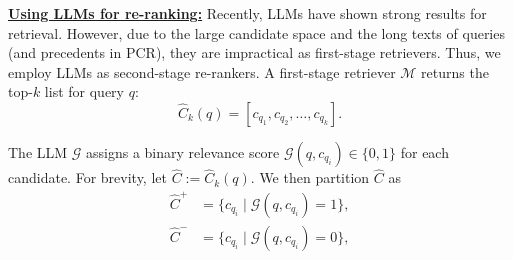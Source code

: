\vspace{1mm}
\noindent\underline{\textbf{Using LLMs for re-ranking:}} 
Recently, LLMs have shown strong results for retrieval. However, due to the large candidate space and the long texts of queries (and precedents in PCR), they are impractical as first-stage retrievers. Thus, we employ LLMs as second-stage re-rankers. A first-stage retriever $\mathcal M$ returns the top-$k$ list for query $q$:
\vspace{-2mm}
\[\hat{C}_k(q) = [c_{q_1}, c_{q_2}, \ldots, c_{q_k}].\]

\vspace{-2mm}
\noindent The LLM $\mathcal G$ assigns a binary relevance score $\mathcal G(q,c_{q_i}) \in \{0,1\}$ for each candidate. For brevity, let $\hat C := \hat{C}_k(q)$. We then partition $\hat C$ as
\vspace{-2mm}
\begin{align*}
\hat C^+ &= \{c_{q_i} \mid \mathcal G(q,c_{q_i})=1\}, \\
\hat C^- &= \{c_{q_i} \mid \mathcal G(q,c_{q_i})=0\},
\end{align*}

